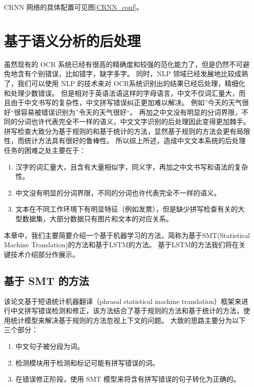 CRNN 网络的具体配置可见图\ref{CRNN_conf}。

\section{基于语义分析的后处理}
虽然现有的 OCR 系统已经有很高的精确度和较强的范化能力了，但是仍然不可避免地含有个别错误，比如错字，缺字多字。
同时，NLP 领域已经发展地比较成熟了，我们可以使用 NLP 的技术来对 OCR系统识别出的结果已经后处理，精细化和处理少数错误。
但是相对于英语法语这样的字母语言，中文不仅词汇量大，而且由于中文书写的复杂性，中文拼写错误纠正更加难以解决。
例如”今天的天气很好“很容易被错误识别为”令天的天气很好“。
再加之中文没有明显的分词界限，不同的分词也许代表完全不一样的语义，中文文字识别的后处理因此变得更加棘手。
拼写检查大致分为基于规则的和基于统计的方法，显然基于规则的方法会更有局限性，而统计方法具有很好的鲁棒性。
所以综上所述，造成中文文本系统的后处理任务的困难之处主要在于：
\begin{enumerate}
	\item 汉字的词汇量大，且含有大量相似字，同义字，再加之中文书写和语法的复杂性。
	\item 中文没有明显的分词界限，不同的分词也许代表完全不一样的语义。
	\item 文本在不同工作环境下有明显特征（例如发票），但是缺少拼写检查有关的大型数据集，大部分数据只有图片和文本的对应关系。
\end{enumerate}

本章中，我们主要简要介绍一个基于机器学习的方法，简称为基于SMT(Statistical Machine Translation)的方法\cite{post_SMT}和基于LSTM的方法\cite{post_LSTM}。
基于LSTM的方法\cite{post_LSTM}我们将在关键技术介绍部分作展示。

\subsection{基于 SMT 的方法}
该论文基于短语统计机器翻译（phrasal statistical machine translation）框架来进行中文拼写错误检测和修正，该方法结合了基于规则的方法和基于统计的方法，使用统计模型来解决基于规则的方法忽视上下文的问题。
大致的思路主要分为以下三个部分：
\begin{enumerate}
	\item 中文句子被分段为词。
	\item 检测模块用于检测和标记可能有拼写错误的词。
	\item 在错误修正阶段，使用 SMT 模型来将含有拼写错误的句子转化为正确的。
\end{enumerate}

